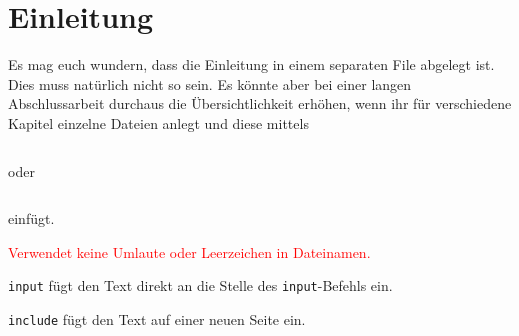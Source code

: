 \chapter{Einleitung}
Es mag euch wundern, dass die Einleitung in einem separaten File abgelegt ist. Dies muss natürlich nicht so sein. Es könnte aber bei einer langen Abschlussarbeit durchaus die Übersichtlichkeit erhöhen, wenn ihr für verschiedene Kapitel einzelne Dateien anlegt und diese mittels 
\begin{verbatim}\end{verbatim}

\bigskip
oder

\bigskip
\begin{verbatim}\end{verbatim}
einfügt.

\bigskip
\noindent\textcolor{red}{Verwendet keine Umlaute oder Leerzeichen in Dateinamen.}

\noindent\texttt{input} fügt den Text direkt an die Stelle des \texttt{input}-Befehls ein.

\noindent\texttt{include} fügt den Text auf einer neuen Seite ein. 
